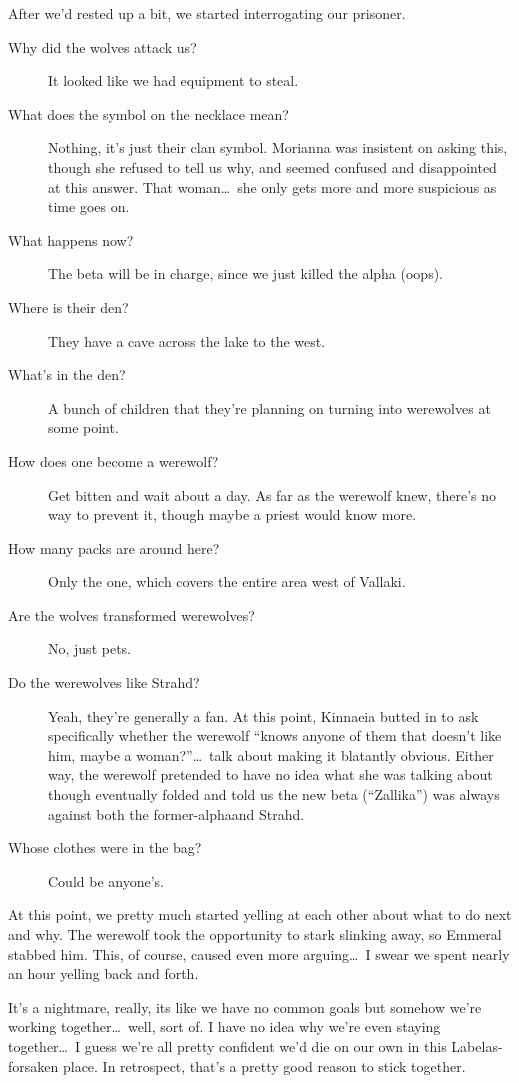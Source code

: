 After we'd rested up a bit, we started interrogating our prisoner.
\begin{description}
\item[Why did the wolves attack us?] It looked like we had equipment to steal.
\item[What does the symbol on the necklace mean?] Nothing, it's just their clan symbol. Morianna was insistent on asking this, though she refused to tell us why, and seemed confused and disappointed at this answer. That woman\dots\ she only gets more and more suspicious as time goes on.
\item[What happens now?] The beta will be in charge, since we just killed the alpha (oops).
\item[Where is their den?] They have a cave across the lake to the west.
\item[What's in the den?] A bunch of children that they're planning on turning into werewolves at some point.
\item[How does one become a werewolf?] Get bitten and wait about a day. As far as the werewolf knew, there's no way to prevent it, though maybe a priest would know more.
\item[How many packs are around here?] Only the one, which covers the entire area west of Vallaki.
\item[Are the wolves transformed werewolves?] No, just pets.
\item[Do the werewolves like Strahd?] Yeah, they're generally a fan. At this point, Kinnaeia butted in to ask specifically whether the werewolf ``knows anyone of them that doesn't like him, maybe a woman?''\dots\ talk about making it blatantly obvious. Either way, the werewolf pretended to have no idea what she was talking about though eventually folded and told us the new beta (``Zallika'') was always against both the former-alphaand Strahd.
\item[Whose clothes were in the bag?] Could be anyone's.
\end{description}

At this point, we pretty much started yelling at each other about what to do next and why. The werewolf took the opportunity to stark slinking away, so Emmeral stabbed him. This, of course, caused even more arguing\dots\ I swear we spent nearly an hour yelling back and forth.

It's a nightmare, really, its like we have no common goals but somehow we're working together\dots\ well, sort of. I have no idea why we're even staying together\dots\ I guess we're all pretty confident we'd die on our own in this Labelas-forsaken place. In retrospect, that's a pretty good reason to stick together.

